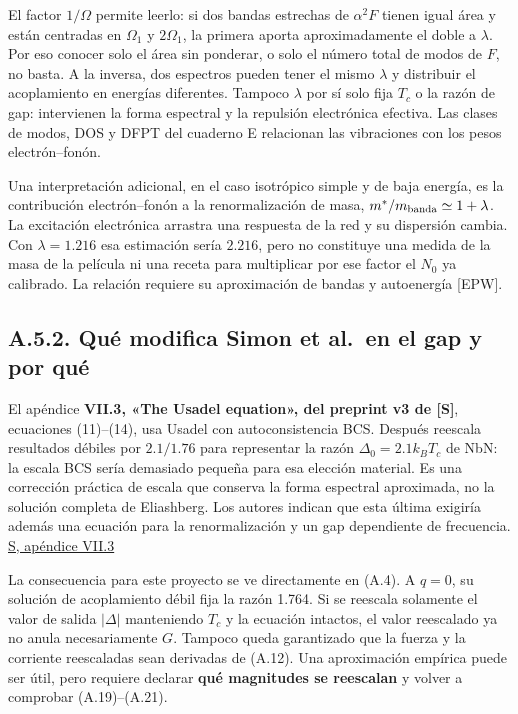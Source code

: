 \documentclass[
  spanish,
  10pt,
  a4paper,
]{article}
\begin{document}
El factor \(1/\Omega\) permite leerlo: si dos bandas estrechas de
\(\alpha^2F\) tienen igual área y están centradas en \(\Omega_1\) y
\(2\Omega_1\), la primera aporta aproximadamente el doble a \(\lambda\).
Por eso conocer solo el área sin ponderar, o solo el número total de
modos de \(F\), no basta. A la inversa, dos espectros pueden tener el
mismo \(\lambda\) y distribuir el acoplamiento en energías diferentes.
Tampoco \(\lambda\) por sí solo fija \(T_c\) o la razón de gap:
intervienen la forma espectral y la repulsión electrónica efectiva. Las
clases de modos, DOS y DFPT del cuaderno E relacionan las vibraciones
con los pesos electrón--fonón.

Una interpretación adicional, en el caso isotrópico simple y de baja
energía, es la contribución electrón--fonón a la renormalización de
masa, \(m^*/m_{\rm banda}\simeq1+\lambda\). La excitación electrónica
arrastra una respuesta de la red y su dispersión cambia. Con
\(\lambda=1.216\) esa estimación sería \(2.216\), pero no constituye una
medida de la masa de la película ni una receta para multiplicar por ese
factor el \(N_0\) ya calibrado. La relación requiere su aproximación de
bandas y autoenergía {[}EPW{]}.

\subsection{A.5.2. Qué modifica Simon et al.~en el gap y por
qué}\label{a.5.2.-quuxe9-modifica-simon-et-al.-en-el-gap-y-por-quuxe9}

El apéndice \textbf{VII.3, «The Usadel equation», del preprint v3 de
{[}S{]}}, ecuaciones (11)--(14), usa Usadel con autoconsistencia BCS.
Después reescala resultados débiles por \(2.1/1.76\) para representar la
razón \(\Delta_0=2.1k_BT_c\) de NbN: la escala BCS sería demasiado
pequeña para esa elección material. Es una corrección práctica de escala
que conserva la forma espectral aproximada, no la solución completa de
Eliashberg. Los autores indican que esta última exigiría además una
ecuación para la renormalización y un gap dependiente de frecuencia.
\href{https://arxiv.org/html/2501.13791v3\#S7.SS3}{S, apéndice VII.3}

La consecuencia para este proyecto se ve directamente en (A.4). A
\(q=0\), su solución de acoplamiento débil fija la razón 1.764. Si se
reescala solamente el valor de salida \(|\Delta|\) manteniendo \(T_c\) y
la ecuación intactos, el valor reescalado ya no anula necesariamente
\(G\). Tampoco queda garantizado que la fuerza y la corriente
reescaladas sean derivadas de (A.12). Una aproximación empírica puede
ser útil, pero requiere declarar \textbf{qué magnitudes se reescalan} y
volver a comprobar (A.19)--(A.21).
\end{document}
